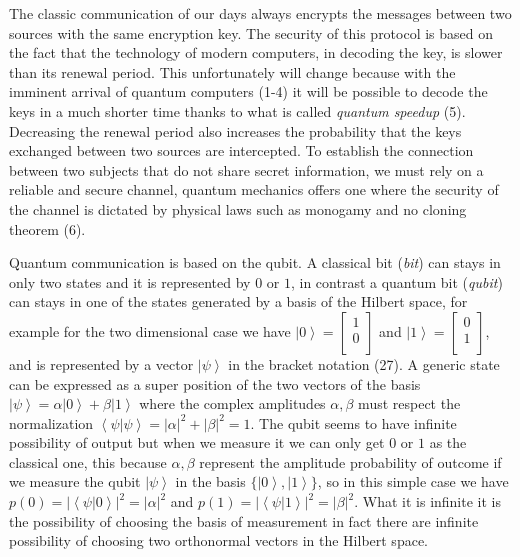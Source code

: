 The classic communication of our days always encrypts the messages between two sources with the same encryption key. The security of this protocol is based on the fact that the technology of modern computers, in decoding the key, is slower than its renewal period. This unfortunately will change because with the imminent arrival of quantum computers (1-4) it will be possible to decode the keys in a much shorter time thanks to what is called \textit{quantum speedup} (5). Decreasing the renewal period also increases the probability that the keys exchanged between two sources are intercepted. To establish the connection between two subjects that do not share secret information, we must rely on a reliable and secure channel, quantum mechanics offers one where the security of the channel is dictated by physical laws such as monogamy and no cloning theorem (6).

Quantum communication is based on the qubit. A classical bit (\textit{bit}) can stays in only two states and it is represented by $0$ or $1$, in contrast a quantum bit (\textit{qubit}) can stays in one of the states generated by  a basis of the Hilbert space, for example for the two dimensional case we have $\left|0\right> = \begin{bmatrix} 1 \\ 0 \\ \end{bmatrix}$ and $\left|1\right> = \begin{bmatrix} 0 \\ 1 \\ \end{bmatrix}$, and is represented by a vector $\left|\psi\right>$ in the bracket notation (27). A generic state can be expressed as a super position of the two vectors of the basis $\left|\psi\right> = \alpha\left|0\right> + \beta\left|1\right>$ where the complex amplitudes $\alpha, \beta$ must respect the normalization $\left<\psi|\psi\right> = |\alpha|^2 + |\beta|^2 = 1$. The qubit seems to have infinite possibility of output but when we measure it we can only get $0$ or $1$ as the classical one, this because $\alpha, \beta$ represent the amplitude probability of outcome if we measure the qubit $\left|\psi\right>$ in the basis $\{\left|0\right>, \left|1\right>\}$, so in this simple case we have $p(0) = |\left<\psi|0\right>|^2 = |\alpha|^2$ and $p(1) = |\left<\psi|1\right>|^2 = |\beta|^2$. What it is infinite it is the possibility of choosing the basis of measurement in fact there are infinite possibility of choosing two orthonormal vectors in the Hilbert space.

